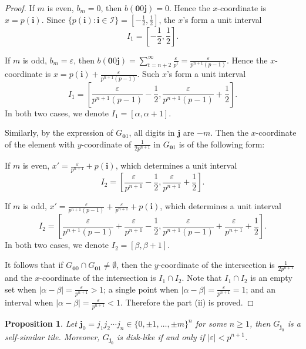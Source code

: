 \documentclass[12pt, reqno]{amsart}
\newtheorem{Prop}[theorem]{Proposition}
\numberwithin{equation}{section}
\begin{document}
\begin{proof}
If $m$ is even, $b_m=0$, then $b({\mathbf 0}0{\mathbf j})=0$. Hence the $x$-coordinate is $x=p({\mathbf i})$. Since $\{p({\mathbf i}): {\mathbf i}\in {\mathcal I}\}=[-\frac{1}{2},\frac{1}{2}]$, the $x$'s form a unit interval
$$I_1=[-\frac{1}{2},\frac{1}{2}].$$

If $m$ is odd, $b_m=\varepsilon$, then $b({\mathbf 0}0{\mathbf j})=\sum_{t=n+2}^\infty\frac{\varepsilon}{p^t}=\frac{\varepsilon}{p^{n+1}(p-1)}$. Hence the $x$-coordinate is $x=p({\mathbf i})+\frac{\varepsilon}{p^{n+1}(p-1)}$. Such $x$'s form a unit interval $$I_1=[\frac{\varepsilon}{p^{n+1}(p-1)}-\frac{1}{2},\frac{\varepsilon}{p^{n+1}(p-1)}+\frac{1}{2}].$$
In both two cases, we denote $I_1=[\alpha, \alpha+1]$.


Similarly, by the expression of $G_{{\mathbf 0}1}$, all digits in ${\mathbf j}$ are $-m$. Then the $x$-coordinate of the element with $y$-coordinate of $\frac{1}{2p^{n+1}}$ in  $G_{{\mathbf 0}1}$  is of the following form:

If $m$ is even, $x'=\frac{\varepsilon}{p^{n+1}}+ p({\mathbf i})$, which determines a unit interval $$I_2=[\frac{\varepsilon}{p^{n+1}}-\frac{1}{2},\frac{\varepsilon}{p^{n+1}}+\frac{1}{2}].$$

If $m$ is odd, $x'=\frac{\varepsilon}{p^{n+1}(p-1)}+\frac{\varepsilon}{p^{n+1}}+ p({\mathbf i})$, which determines a unit interval $$I_2=[\frac{\varepsilon}{p^{n+1}(p-1)}+\frac{\varepsilon}{p^{n+1}}-\frac{1}{2},\frac{\varepsilon}{p^{n+1}(p-1)}+\frac{\varepsilon}{p^{n+1}}+\frac{1}{2}].$$
In both two cases, we denote $I_2=[\beta,\beta+1]$.


It follows that if $G_{{\mathbf 0}0}\cap G_{{\mathbf 0}1}\ne \emptyset$, then the $y$-coordinate of the intersection is  $\frac{1}{2p^{n+1}}$  and the $x$-coordinate of the intersection is $I_1\cap I_2$. Note that  $I_1\cap I_2$ is an empty set when $|\alpha-\beta|=\frac{\varepsilon}{p^{n+1}}>1$; a single point when $|\alpha-\beta|=\frac{\varepsilon}{p^{n+1}}=1$; and an interval when  $|\alpha-\beta|=\frac{\varepsilon}{p^{n+1}}<1$. Therefore the  part (ii) is proved.
\end{proof}


\begin{Prop}\label{prop2}
Let ${\mathbf j}_0=j_1j_2\cdots j_n\in \{0,\pm1,\dots, \pm m\}^n$ for some $n\geq 1$, then $G_{{\mathbf j}_0}$  is a self-similar tile. Moreover, $G_{{\mathbf j}_0}$ is disk-like if and only if $|\varepsilon|<p^{n+1}$.
\end{Prop}
\end{document}
